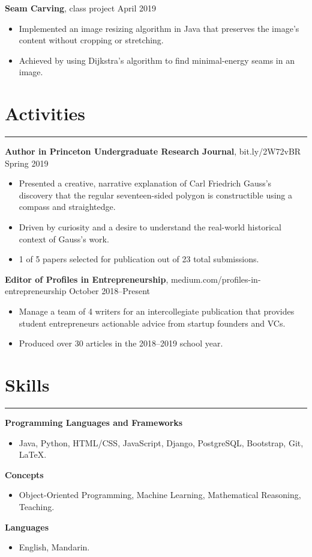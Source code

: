 \documentclass[11pt]{article}
\newcommand{\resumesection}[1]{\vspace{-0.2cm}\section*{#1}\vspace{-0.2cm}\hrule\vspace{0.2cm}}
\begin{document}
\textbf{Seam Carving}, class project \hfill April 2019
\begin{itemize}
	\item Implemented an image resizing algorithm in Java that preserves the image's content without cropping or stretching.
	\item Achieved by using Dijkstra's algorithm to find minimal-energy seams in an image.
\end{itemize}

\resumesection{Activities}

\textbf{Author in Princeton Undergraduate Research Journal}, bit.ly/2W72vBR \hfill Spring 2019
\begin{itemize}
	\item Presented a creative, narrative explanation of Carl Friedrich Gauss's discovery that the regular seventeen-sided polygon is constructible using a compass and straightedge.
	\item Driven by curiosity and a desire to understand the real-world historical context of Gauss's work.
	\item 1 of 5 papers selected for publication out of 23 total submissions.
\end{itemize}

\textbf{Editor of Profiles in Entrepreneurship}, medium.com/profiles-in-entrepreneurship \hfill October 2018--Present
\begin{itemize}
	\item Manage a team of 4 writers for an intercollegiate publication that provides student entrepreneurs actionable advice from startup founders and VCs.
	\item Produced over 30 articles in the 2018--2019 school year.
\end{itemize}

\resumesection{Skills}

\textbf{Programming Languages and Frameworks}
\begin{itemize}
	\item Java, Python, HTML/CSS, JavaScript, Django, PostgreSQL, Bootstrap, Git, \LaTeX.
\end{itemize}

\textbf{Concepts}
\begin{itemize}
	\item Object-Oriented Programming, Machine Learning, Mathematical Reasoning, Teaching.
\end{itemize}

\textbf{Languages}
\begin{itemize}
	\item English, Mandarin.
\end{itemize}
\end{document}
